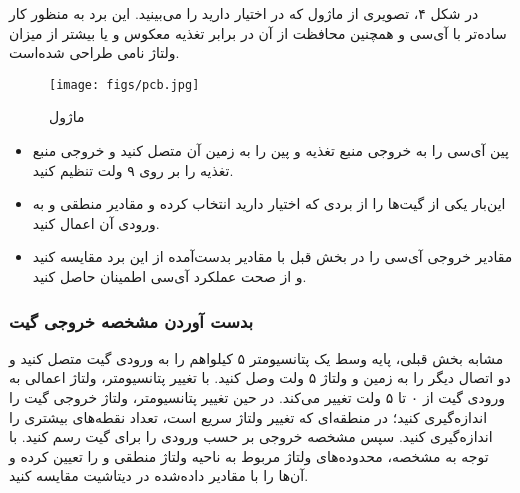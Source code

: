 \documentclass[12pt]{article}
\begin{document}
در شکل ۴، تصویری از ماژول  که در اختیار دارید را می‌بینید. این برد به منظور کار ساده‌تر با آی‌سی  و همچنین محافظت از آن در برابر تغذیه معکوس و یا بیشتر از میزان ولتاژ نامی طراحی شده‌است. 
\begin{figure}[!h]
    \centering
    \texttt{[image: figs/pcb.jpg]}
    \caption{ماژول }
    \label{fig:3}
\end{figure}
\begin{itemize}
    \item پین  آی‌سی را به خروجی منبع تغذیه و پین  را به زمین آن متصل کنید و خروجی منبع تغذیه را بر روی ۹ ولت  تنظیم کنید.  
    \item این‌بار یکی از گیت‌ها را از بردی که اختیار دارید انتخاب کرده و مقادیر منطقی  و  به ورودی آن اعمال کنید.
    \item مقادیر خروجی آی‌سی  را در بخش قبل با مقادیر بدست‌آمده از این برد مقایسه کنید و از صحت عملکرد آ‌ی‌سی اطمینان حاصل کنید.
\end{itemize}

\subsubsection{بدست‌ ‌آوردن مشخصه خروجی گیت }
مشابه بخش قبلی، پایه وسط یک پتانسیومتر ۵ کیلو‌اهم را به ورودی گیت متصل کنید و دو اتصال دیگر را به زمین و ولتاژ ۵ ولت  وصل کنید. با تغییر پتانسیومتر، ولتاژ اعمالی به ورودی گیت از ۰ تا ۵ ولت تغییر می‌کند. در حین تغییر پتانسیو‌متر، ولتاژ خروجی گیت را اندازه‌گیری کنید؛ در منطقه‌ای که تغییر ولتاژ سریع است، تعداد نقطه‌های بیشتری را اندازه‌گیری کنید. سپس مشخصه خروجی بر حسب ورودی را برای گیت رسم کنید. با توجه به مشخصه، محدوده‌های ولتاژ مربوط به ناحیه ولتاژ منطقی  و  را تعیین کرده و آن‌ها را با مقادیر داده‌شده در دیتاشیت مقایسه کنید.
\end{document}
